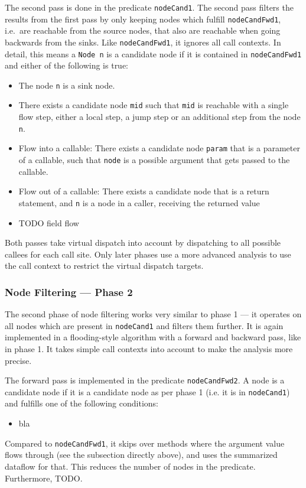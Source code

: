 The second pass is done in the predicate \texttt{nodeCand1}.
The second pass filters the results from the first pass by only keeping nodes
which fulfill \texttt{nodeCandFwd1}, i.e.\ are reachable from the source nodes,
that also are reachable when going backwards from the sinks.
Like \texttt{nodeCandFwd1}, it ignores all call contexts.
In detail, this means a \texttt{Node n} is a candidate node if it is contained in 
\texttt{nodeCandFwd1} and either of the following is true:
\begin{itemize}
    \item The node \texttt{n} is a sink node.
    \item There exists a candidate node \texttt{mid} such that \texttt{mid} is reachable with a single flow step,
    either a local step, a jump step or an additional step from the node \texttt{n}.
    \item Flow into a callable:
    There exists a candidate node \texttt{param} that is a parameter of a callable,
    such that \texttt{node} is a possible argument that gets passed to the callable.
    \item Flow out of a callable:
    There exists a candidate node that is a return statement, and \texttt{n} is 
    a node in a caller, receiving the returned value
    \item TODO field flow
\end{itemize}

Both passes take virtual dispatch into account by dispatching to all possible callees
for each call site. Only later phases use a more advanced analysis to use the call context 
to restrict the virtual dispatch targets.

\subsubsection*{Node Filtering --- Phase 2}
The second phase of node filtering works very similar to phase 1 --- it 
operates on all nodes which are present in \texttt{nodeCand1} and filters them further.
It is again implemented in a flooding-style algorithm with a forward and backward 
pass, like in phase 1.
It takes simple call contexts into account to make the analysis more precise.

The forward pass is implemented in the predicate \texttt{nodeCandFwd2}.
A node is a candidate node if it is a candidate node as per phase 1 
(i.e. it is in \texttt{nodeCand1})
and fulfills one of the following conditions:
\begin{itemize}
    \item bla
\end{itemize}
Compared to \texttt{nodeCandFwd1}, it skips over methods where the argument value 
flows through (see the subsection directly above), and uses the summarized dataflow for that.
This reduces the number of nodes in the predicate.
Furthermore, TODO.%

